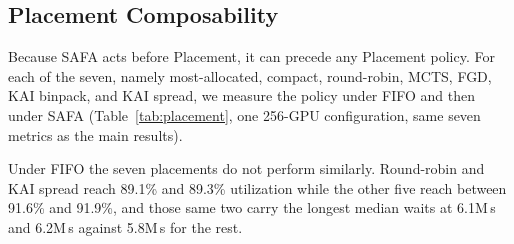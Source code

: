\documentclass{ieeetj}
\begin{document}
\begin{table}[htb!]
\centering
\caption{Generalization across independent large-scale traces}
\label{tab:trace3}
\scriptsize
\setlength{\tabcolsep}{4pt}
\end{table}

\subsection{Placement Composability}\label{eval:robust:placement}
Because SAFA acts before Placement, it can precede any Placement policy. For each of the seven, namely most-allocated, compact, round-robin, MCTS, FGD, KAI binpack, and KAI spread, we measure the policy under FIFO and then under SAFA (Table~\ref{tab:placement}, one 256-GPU configuration, same seven metrics as the main results).

Under FIFO the seven placements do not perform similarly. Round-robin and KAI spread reach 89.1\% and 89.3\% utilization while the other five reach between 91.6\% and 91.9\%, and those same two carry the longest median waits at 6.1M\,s and 6.2M\,s against 5.8M\,s for the rest.
\end{document}
